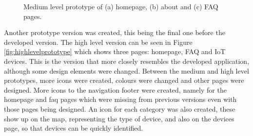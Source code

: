 \begin{figure}
\begin{subfigure}{0.33\textwidth}
        \caption{}
        \label{fig:mediumfaq}
    \end{subfigure}%
    \caption{Medium level prototype of (a) homepage, (b) about and (c) FAQ pages.}
    \label{fig:mediumlevelprototype}
\end{figure}

Another prototype version was created, this being the final one before
the developed version. The high level version can be seen in Figure \ref{fig:highlevelprototype}
which shows three pages: homepage, FAQ and IoT devices. This is the version
that more closely resembles the developed application, although some design
elements were changed. Between the medium and high level prototypes, more icons
were created, colours were changed and other pages were designed. More icons
to the navigation footer were created, namely for the homepage and faq pages
which were missing from previous versions even with those pages being designed.
An icon for each category was also created, these show up on the map, representing
the type of device, and also on the devices page, so that devices can be quickly
identified.

